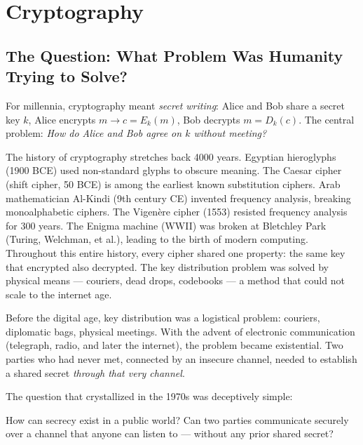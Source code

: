 
\chapter{Cryptography}
\label{ch:cryptography}

\section{The Question: What Problem Was Humanity Trying to Solve?}
\label{sec:crypto:question}

For millennia, cryptography meant \emph{secret writing}: Alice and Bob share a secret key $k$, Alice encrypts $m \to c = E_k(m)$, Bob decrypts $m = D_k(c)$. The central problem: \emph{How do Alice and Bob agree on $k$ without meeting?}

The history of cryptography stretches back 4000 years. Egyptian hieroglyphs (1900 BCE) used non-standard glyphs to obscure meaning. The Caesar cipher (shift cipher, 50 BCE) is among the earliest known substitution ciphers. Arab mathematician Al-Kindi (9th century CE) invented frequency analysis, breaking monoalphabetic ciphers. The Vigenère cipher (1553) resisted frequency analysis for 300 years. The Enigma machine (WWII) was broken at Bletchley Park (Turing, Welchman, et al.), leading to the birth of modern computing. Throughout this entire history, every cipher shared one property: the same key that encrypted also decrypted. The key distribution problem was solved by physical means — couriers, dead drops, codebooks — a method that could not scale to the internet age.

Before the digital age, key distribution was a logistical problem: couriers, diplomatic bags, physical meetings. With the advent of electronic communication (telegraph, radio, and later the internet), the problem became existential. Two parties who had never met, connected by an insecure channel, needed to establish a shared secret \emph{through that very channel}.

The question that crystallized in the 1970s was deceptively simple:

How can secrecy exist in a public world? Can two parties communicate securely over a channel that anyone can listen to — without any prior shared secret?


